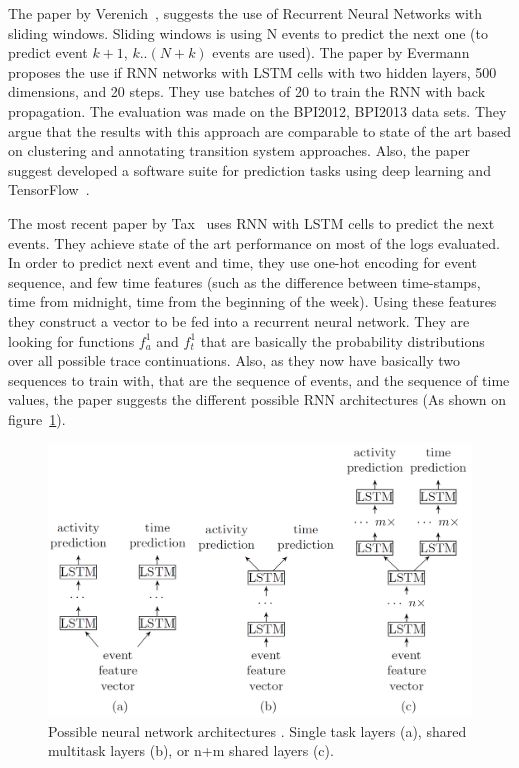The paper by Verenich~\cite{quteprints96732}, suggests the use of Recurrent Neural Networks with sliding windows. Sliding windows is using N events to predict the next one (to predict event $k+1$,  $k..(N+k)$ events are used). The paper by Evermann\cite{evermann} proposes the use if RNN networks with LSTM cells with two hidden layers, 500 dimensions, and 20 steps. They use batches of 20 to train the RNN with back propagation. The evaluation was made on the BPI2012, BPI2013 data sets. They argue that the results with this approach are comparable to state of the art based on clustering and annotating transition system approaches. Also, the paper~\cite{evermann2} suggest developed a software suite for prediction tasks using deep learning and TensorFlow~\cite{tensorflow2015-whitepaper}.

The most recent paper by Tax~\cite{niek96732} uses RNN with LSTM cells to predict the next events. They achieve state of the art performance on most of the logs evaluated. In order to predict next event and time, they use one-hot encoding for event sequence, and few time features (such as the difference between time-stamps, time from midnight, time from the beginning of the week). Using these features they construct a vector to be fed into a recurrent neural network. They are looking for functions $f_a^1$ and $f_t^1$ that are basically the probability distributions over all possible trace continuations. Also, as they now have basically two sequences to train with, that are the sequence of events, and the sequence of time values, the paper suggests the different possible RNN architectures (As shown on figure~\ref{figure:architectureslstm}). 

\begin{figure}[!ht]
	\begin{center}  
		\includegraphics[width=\textwidth]{1.png}
		\caption{Possible neural network architectures \cite{niek96732}. Single task layers (a), shared multitask layers (b), or n+m shared layers (c).}
		\label{figure:architectureslstm}	
	\end{center}
\end{figure}


